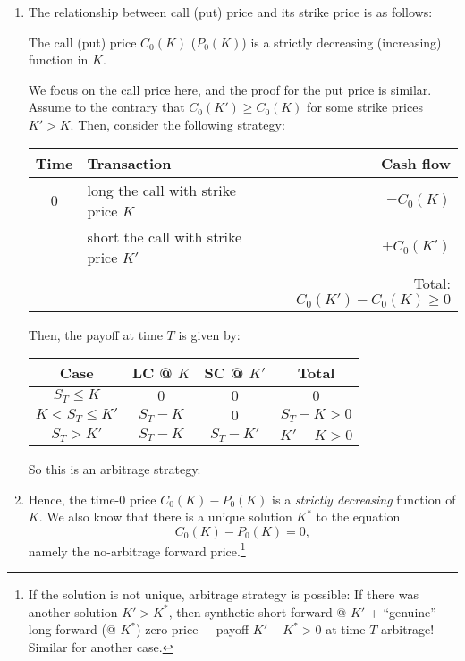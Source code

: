 \begin{enumerate}
\item The relationship between call (put) price and its strike price is as follows:
\begin{proposition}
\label{prp:call-put-price-strike-relationship}
The call (put) price \(C_0(K)\) (\(P_0(K)\)) is a strictly decreasing
(increasing) function in \(K\).
\end{proposition}
\begin{pf}
We focus on the call price here, and the proof for the put price is similar.
Assume to the contrary that \(C_0(K')\ge C_0(K)\) for some strike prices
\(K'>K\).  Then, consider the following strategy:
\begin{center}
\begin{tabular}{clr}
\toprule
Time&Transaction&Cash flow\\
\midrule
0&long the call with strike price \(K\)&\(-C_0(K)\)\\
&short the call with strike price \(K'\)&\(+C_0(K')\)\\
&&Total: \(C_0(K')-C_0(K)\ge 0\)\\
\bottomrule
\end{tabular}
\end{center}
Then, the payoff at time \(T\) is given by:
\begin{center}
\begin{tabular}{cccc}
\toprule
Case&LC @ \(K\)&SC @ \(K'\)& Total\\
\midrule
\(S_T\le K\)&\(0\)&\(0\)&\(0\)\\
\(K<S_T\le K'\)&\(S_T-K\)&\(0\)&\(S_T-K>0\)\\
\(S_T>K'\)&\(S_T-K\)&\(S_T-K'\)&\(K'-K>0\)\\
\bottomrule
\end{tabular}
\end{center}
So this is an arbitrage strategy.
\end{pf}

\item Hence, the time-0 price \(C_0(K)-P_0(K)\) is a \emph{strictly decreasing}
function of \(K\). We also know that there is a unique solution \(K^*\) to the
equation
\[
C_0(K)-P_0(K)=0,
\]
namely the no-arbitrage forward price.\footnote{If the solution is not unique,
arbitrage strategy is possible: If there was another solution \(K'>K^*\), then
synthetic short forward @ \(K'\) + ``genuine'' long forward (@ \(K^*\))
 zero price + payoff \(K'-K^*>0\) at time \(T\)
 arbitrage! Similar for another case.}


\end{enumerate}
